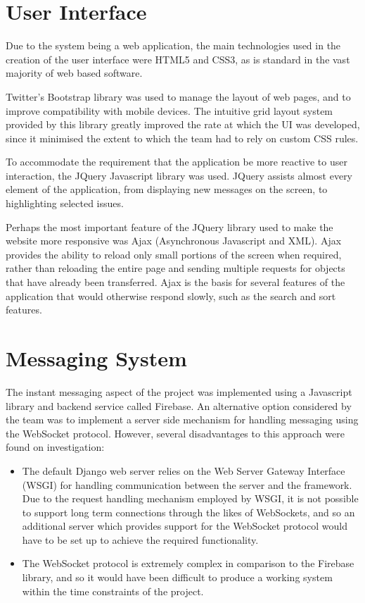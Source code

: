 \documentclass[a4paper]{l3proj}
\begin{document}
\section{User Interface}
\label{userInterface}

Due to the system being a web application, the main technologies used in the creation of the user interface were HTML5 and CSS3, as is standard in the vast majority of web based software. 

Twitter’s Bootstrap library was used to manage the layout of web pages, and to improve compatibility with mobile devices. The intuitive grid layout system provided by this library greatly improved the rate at which the UI was developed, since it minimised the extent to which the team had to rely on custom CSS rules.

To accommodate the requirement that the application be more reactive to user interaction, the JQuery Javascript library was used. JQuery assists almost every element of the application, from displaying new messages on the screen, to highlighting selected issues. 

Perhaps the most important feature of the JQuery library used to make the website more responsive was Ajax (Asynchronous Javascript and XML). Ajax provides the ability to reload only small portions of the screen when required, rather than reloading the entire page and sending multiple requests for objects that have already been transferred. Ajax is the basis for several features of the application that would otherwise respond slowly, such as the search and sort features.
\section{Messaging System}
\label{messagingSystem}

The instant messaging aspect of the project was implemented using a Javascript library and backend service called Firebase. An alternative option considered by the team was to implement a server side mechanism for handling messaging using the WebSocket protocol. However, several disadvantages to this approach were found on investigation:

\begin{itemize}
\item The default Django web server relies on the Web Server Gateway Interface (WSGI) for handling communication between the server and the framework. Due to the request handling mechanism employed by WSGI, it is not possible to support long term connections through the likes of WebSockets, and so an additional server which provides support for the WebSocket protocol would have to be set up to achieve the required functionality.
\item The WebSocket protocol is extremely complex in comparison to the Firebase library, and so it would have been difficult to produce a working system within the time constraints of the project.
\end{itemize}
\end{document}
